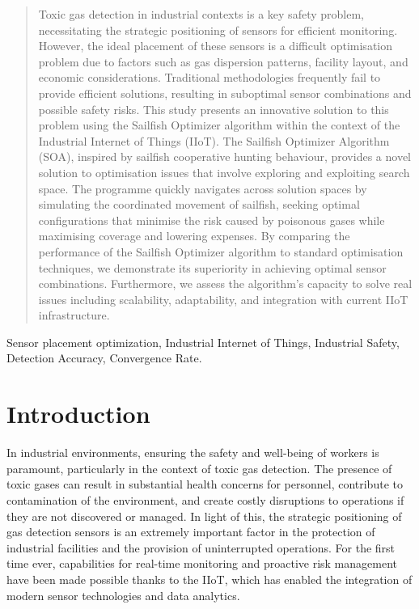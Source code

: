 \documentclass[conference]{IEEEtran}
\begin{document}
\begin{abstract}
Toxic gas detection in industrial contexts is a key safety problem, necessitating the strategic positioning of sensors for efficient monitoring. However, the ideal placement of these sensors is a difficult optimisation problem due to factors such as gas dispersion patterns, facility layout, and economic considerations. Traditional methodologies frequently fail to provide efficient solutions, resulting in suboptimal sensor combinations and possible safety risks. This study presents an innovative solution to this problem using the Sailfish Optimizer algorithm within the context of the Industrial Internet of Things (IIoT). The Sailfish Optimizer Algorithm (SOA), inspired by sailfish cooperative hunting behaviour, provides a novel solution to optimisation issues that involve exploring and exploiting search space. The programme quickly navigates across solution spaces by simulating the coordinated movement of sailfish, seeking optimal configurations that minimise the risk caused by poisonous gases while maximising coverage and lowering expenses. By comparing the performance of the Sailfish Optimizer algorithm to standard optimisation techniques, we demonstrate its superiority in achieving optimal sensor combinations. Furthermore, we assess the algorithm's capacity to solve real issues including scalability, adaptability, and integration with current IIoT infrastructure.
\end{abstract}

\begin{IEEEkeywords}
Sensor placement optimization, Industrial Internet of Things, Industrial Safety, Detection Accuracy, Convergence Rate.
\end{IEEEkeywords}

\section{Introduction}\label{sec1}

In industrial environments, ensuring the safety and well-being of workers is paramount, particularly in the context of toxic gas detection. The presence of toxic gases can result in substantial health concerns for personnel, contribute to contamination of the environment, and create costly disruptions to operations if they are not discovered or managed\cite{cui2023toxic}. In light of this, the strategic positioning of gas detection sensors is an extremely important factor in the protection of industrial facilities and the provision of uninterrupted operations. For the first time ever, capabilities for real-time monitoring and proactive risk management have been made possible thanks to the IIoT, which has enabled the integration of modern sensor technologies and data analytics\cite{jena2023lpg}.
\end{document}
